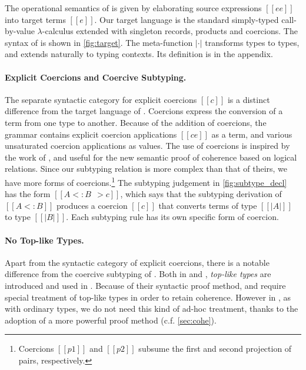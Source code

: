 The operational semantics of \name is given by elaborating source expressions
$[[ee]]$ into target terms $[[e]]$. Our target language \tname is the standard
simply-typed call-by-value $\lambda$-calculus extended with singleton records,
products and coercions. The syntax of \tname is shown in \cref{fig:target}. The
meta-function $| \cdot |$ transforms \name types to \tname types, and extends
naturally to typing contexts. Its definition is in the appendix.


\paragraph{Explicit Coercions and Coercive Subtyping.}
The separate syntactic category for explicit coercions $[[c]]$ is a distinct
difference from the target language of \oname. Coercions express the conversion
of a term from one type to another. Because of the addition of coercions, the
grammar contains explicit coercion applications $[[c e]]$ as a term, and various
unsaturated coercion applications as values. The use of coercions is inspired by
the work of \citet{biernacki2015logical}, and useful for the new semantic
proof of coherence based on logical relations.
Since our subtyping relation is more complex than that of
theirs, we have more forms of
coercions.\footnote{Coercions $[[p1]]$ and $[[p2]]$ subsume the first and second
  projection of pairs, respectively.} The subtyping judgement in
\cref{fig:subtype_decl} has the form $[[A <: B ~~> c]]$, which says that the
subtyping derivation of $[[A <: B]]$ produces a coercion $[[c]]$ that converts
terms of type $[[ |A| ]]$ to type $[[ |B| ]]$. Each subtyping rule has its own
specific form of coercion.


\paragraph{No Top-like Types.}
Apart from the syntactic category of explicit coercions, there is a notable
difference from the coercive subtyping of \oname. Both in \oname and \fname,
\textit{top-like types} are introduced and used in . Because
of their syntactic proof method, \oname and \fname require special treatment of top-like types
in order to retain coherence. However in \name, as with ordinary types, we do
not need this kind of ad-hoc treatment, thanks to the adoption of a more powerful
proof method (c.f. \cref{sec:cohe}).


